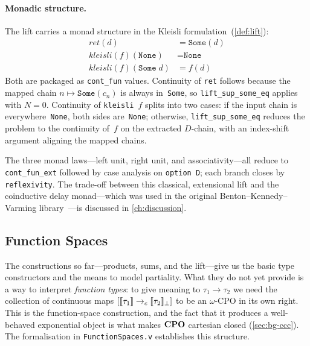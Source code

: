 \paragraph{Monadic structure.}
The lift carries a monad structure in the Kleisli
formulation~(\cref{def:lift}):
%
\begin{align*}
  \mathit{ret}(d) &= \texttt{Some}(d) \\
  \mathit{kleisli}(f)(\texttt{None}) &= \texttt{None} \\
  \mathit{kleisli}(f)(\texttt{Some}\;d) &= f(d)
\end{align*}
%
Both are packaged as \texttt{cont\_fun} values.  Continuity of
\texttt{ret} follows because the mapped chain
$n \mapsto \texttt{Some}(c_n)$ is always in~\texttt{Some}, so
\texttt{lift\_sup\_some\_eq} applies with $N = 0$.  Continuity of
\texttt{kleisli}~$f$ splits into two cases: if the input chain is
everywhere~\texttt{None}, both sides are~\texttt{None}; otherwise,
\texttt{lift\_sup\_some\_eq} reduces the problem to the continuity
of~$f$ on the extracted $D$-chain, with an index-shift argument
aligning the mapped chains.

The three monad laws---left unit, right unit, and associativity---all
reduce to \texttt{cont\_fun\_ext} followed by case analysis on
\texttt{option~D}; each branch closes by \texttt{reflexivity}.
The trade-off between this classical, extensional lift and the
coinductive delay monad---which was used in the original
Benton--Kennedy--Varming library~\cite{BKV2009}---is discussed in
\cref{ch:discussion}.


\subsection{Function Spaces}
\label{sec:meth-function-spaces}


The constructions so far---products, sums, and the lift---give us the
basic type constructors and the means to model partiality.  What they do
not yet provide is a way to interpret \emph{function types}: to give
meaning to $\tau_1 \to \tau_2$ we need the collection of continuous maps
$[\llbracket \tau_1 \rrbracket \to_c \llbracket \tau_2 \rrbracket_\bot]$ to be an $\omega$-CPO in its
own right.  This is the function-space construction, and the fact that
it produces a well-behaved exponential object is what makes $\mathbf{CPO}$
cartesian closed (\cref{sec:bg-ccc}).  The formalisation in
\texttt{FunctionSpaces.v} establishes this structure.

